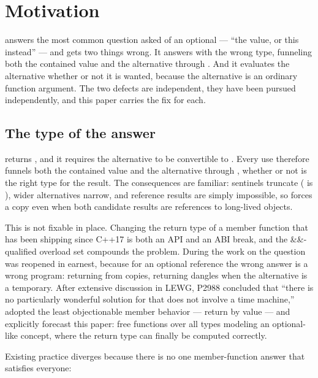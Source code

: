 \documentclass[a4paper,10pt,oneside,openany,final,article]{memoir}
\begin{document}
\chapter{Motivation}

 answers the most common question asked of
an optional --- ``the value, or this instead'' --- and gets two things
wrong. It answers with the wrong type, funneling both the contained value
and the alternative through . And it evaluates the alternative
whether or not it is wanted, because the alternative is an ordinary function
argument. The two defects are independent, they have been pursued
independently, and this paper carries the fix for each.

\section{The type of the answer}

 returns , and it requires the alternative to be
convertible to . Every use therefore funnels both the contained
value and the alternative through , whether or not  is the
right type for the result. The consequences are familiar: sentinels truncate
( is ), wider
alternatives narrow, and reference results are simply impossible, so
 forces a copy even when both candidate results are
references to long-lived objects.

This is not fixable in place. Changing the return type of a member function
that has been shipping since C++17 is both an API and an ABI break, and the
\&\&-qualified overload set compounds the problem. During the work on
 \cite{P2988R12} the question was reopened in
earnest, because for an optional reference the wrong answer is a wrong
program: returning  from
 copies, returning  dangles when
the alternative is a temporary. After extensive discussion in LEWG, P2988
concluded that ``there is no particularly wonderful solution for
 that does not involve a time machine,'' adopted the least
objectionable member behavior --- return  by value ---
and explicitly forecast this paper: free functions over all types modeling
an optional-like concept, where the return type can finally be computed
correctly.

Existing practice diverges because there is no one member-function answer
that satisfies everyone:
\end{document}
